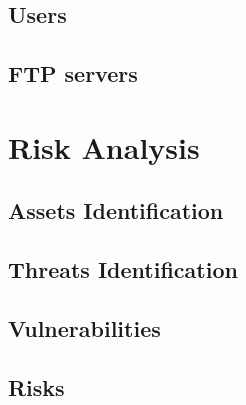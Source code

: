 \documentclass[a4paper,11pt]{article}
\begin{document}
\subsection{Users}
\subsection{FTP servers}




 


\section{Risk Analysis}
\subsection{Assets Identification}
\subsection{Threats Identification}
\subsection{Vulnerabilities}
\subsection{Risks}
\end{document}

